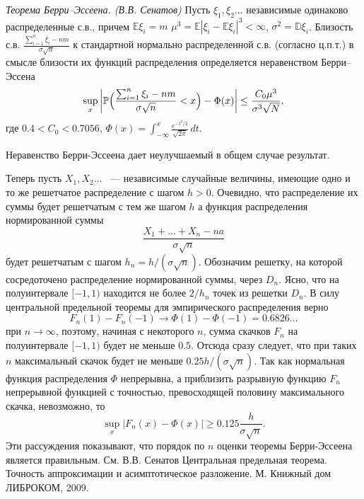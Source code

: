 \begin{remark}
\textit{Теорема Берри--Эссеена. (В.В. Сенатов)} 
\label{sec:BerryEssen}
 Пусть $\xi_1, \xi_2\dots$ независимые одинаково распределенные с.в., причем $\mathbb{E}\xi_i = m$
 $\mu^3={\mathbb E}|\xi_i - {\mathbb E}\xi_i|^3<\infty$, $\sigma^2=\mathbb D \xi_i$.
Близость с.в. $\frac{\sum_{i=1}^{n}\xi_i-nm}{\sigma\sqrt{n}}$ к стандартной нормально распределенной с.в. (согласно ц.п.т.) в смысле 
близости их функций распределения определяется неравенством Берри--Эссена 
$$
\sup\limits_x \left| {\mathbb P}\Bigl( \frac{\sum_{i=1}^{n}\xi_i-nm}{\sigma\sqrt{n}}<x \Bigr) - \Phi(x) 
\right| \le \frac{C_0 \mu^3}{\sigma^3 \sqrt{N}} , 
$$
где $0.4<C_0<0.7056$,
$\Phi(x)=\int_{-\infty}^x \frac{e^{-t^2/2}}{\sqrt{2\pi}}\, dt$. 

Неравенство Берри-Эссеена дает неулучшаемый в общем случае результат. 

Теперь пусть $X_1, X_2\dots$ ~--- независимые случайные величины, имеющие одно и то же решетчатое распределение с шагом $h>0$. Очевидно, что распределение их суммы будет решетчатым с тем же шагом $h$  а функция распределения нормированной суммы
\begin{equation*}
\frac{X_1+\dots+X_n- na}{\sigma \sqrt{n}} 
\end{equation*}
будет решетчатым с шагом $h_n = h/(\sigma\sqrt{n})$. Обозначим решетку, на которой сосредоточено распределение нормированной суммы, через $D_n$. Ясно, что на полуинтервале $[-1,1)$ находится не более $2/h_n$ точек из решетки $D_n$. В силу центральной предельной теоремы для эмпирического распределения верно
\begin{equation*} 
F_n(1)-F_n(-1)\to \Phi (1)-\Phi (-1) = 0.6826\dots
\end{equation*}
при $n\to\infty$, поэтому, начиная   с некоторого  $n$, сумма скачков  $F_n$ на полуинтервале $[-1,1)$ будет не меньше $0.5$. Отсюда сразу следует, что при таких $n$ максимальный скачок будет не меньше $0.25h/(\sigma\sqrt{n})$. Так как нормальная функция распределения $\Phi$ непрерывна, а приблизить разрывную функцию $F_n$ непрерывной функцией с точностью, превосходящей половину максимального скачка, невозможно, то 
\begin{equation*}
\sup_x|F_n(x)-\Phi(x)| \geq 0.125 \frac{h}{\sigma \sqrt{n}}.
\end{equation*}
Эти рассуждения показывают, что порядок по $n$ оценки теоремы Берри-Эссеена является правильным.
См. В.В. Сенатов Центральная предельная теорема. Точность аппроксимации и асимптотическое разложение. М. Книжный дом ЛИБРОКОМ, 2009.
\end{remark}


